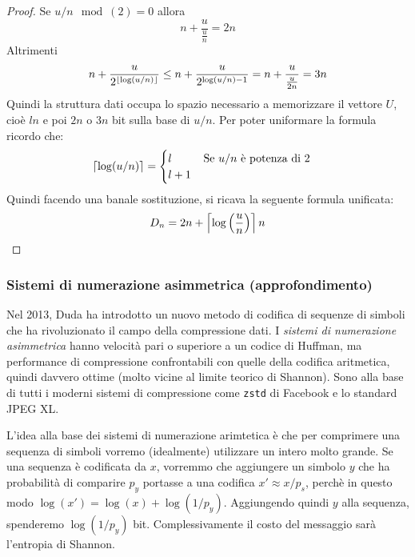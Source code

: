 \begin{proof}
    Se $u/n \mod(2) = 0$ allora
    \begin{equation*}
        n + \frac{u}{\frac{u}{n}} = 2n
    \end{equation*}
    Altrimenti
    \begin{equation*}
        n + \frac{u}{2^{\left\lfloor \log(u/n) \right\rfloor}} \leq  n + \frac{u}{2^{\log(u/n) - 1}} = n + \frac{u}{\frac{u}{2n}} = 3n
    \end{equation*}
    Quindi la struttura dati occupa lo spazio necessario a memorizzare il vettore $U$, cioè $ln$ e poi $2n$ o $3n$ bit sulla base di $u/n$. Per poter uniformare la formula ricordo che:
    \begin{equation*}
        \left\lceil \log(u/n) \right\rceil =
        \begin{cases}
            l \hspace{1cm}\textnormal{Se $u/n$ è potenza di 2}\\
            l + 1
        \end{cases}
    \end{equation*}
    Quindi facendo una banale sostituzione, si ricava la seguente formula unificata:
    \begin{equation}
        D_n = 2n + \left\lceil \log\left(\frac{u}{n}\right) \right\rceil n
    \end{equation}
\end{proof}
\subsubsection{Sistemi di numerazione asimmetrica (approfondimento)}
Nel 2013, Duda \cite{duda} ha introdotto un nuovo metodo di codifica di sequenze di simboli che ha rivoluzionato il campo della compressione dati. I \textit{sistemi di numerazione asimmetrica} hanno velocità pari o superiore a un codice di Huffman, ma performance di compressione confrontabili con quelle della codifica aritmetica, quindi davvero ottime (molto vicine al limite teorico di Shannon). Sono alla base di tutti i moderni sistemi di compressione come \texttt{zstd} di Facebook e lo standard JPEG XL.

L'idea alla base dei sistemi di numerazione arimtetica è che per comprimere una sequenza di simboli vorremo (idealmente) utilizzare un intero molto grande. Se una sequenza è codificata da $x$, vorremmo che aggiungere un simbolo $y$ che ha probabilità di comparire $p_y$ portasse a una codifica $x' \approx x / p_s$, perchè in questo modo $\log(x') = \log(x) + \log(1 / p_y)$. Aggiungendo quindi $y$ alla sequenza, spenderemo $\log(1 / p_y)$ bit. Complessivamente il costo del messaggio sarà l'entropia di Shannon.


